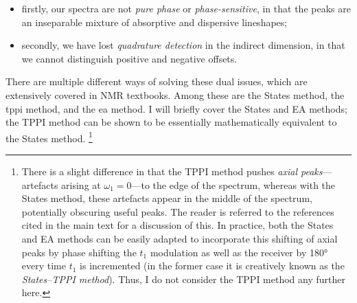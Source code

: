 \begin{itemize}
    \item firstly, our spectra are not \textit{pure phase} or \textit{phase-sensitive}, in that the peaks are an inseparable mixture of absorptive and dispersive lineshapes;
    \item secondly, we have lost \textit{quadrature detection} in the indirect dimension, in that we cannot distinguish positive and negative offsets.
\end{itemize}

There are multiple different ways of solving these dual issues, which are extensively covered in NMR textbooks.\autocite{Ernst1987,Keeler2010,Levitt2008,Claridge2016,Cavanagh2007}
Among these are the States method\autocite{States1982JMR}, the \ac{tppi} method\autocite{Marion1983BBRC}, and the \ac{ea} method.
I will briefly cover the States and EA methods; the TPPI method can be shown to be essentially mathematically equivalent to the States method\autocite{Keeler1985JMR}.%
\footnote{There is a slight difference in that the TPPI method pushes \textit{axial peaks}---artefacts arising at $\omega_1 = 0$---to the edge of the spectrum, whereas with the States method, these artefacts appear in the middle of the spectrum, potentially obscuring useful peaks. The reader is referred to the references cited in the main text for a discussion of this.
In practice, both the States and EA methods can be easily adapted to incorporate this shifting of axial peaks by phase shifting the $t_1$ modulation as well as the receiver by \ang{180} every time $t_1$ is incremented (in the former case it is creatively known as the \textit{States--TPPI method}).
Thus, I do not consider the TPPI method any further here.}

